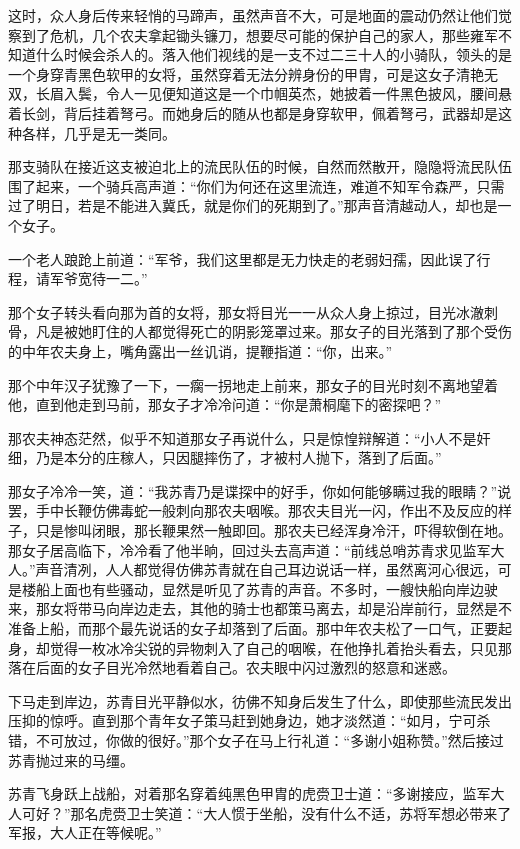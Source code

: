 这时，众人身后传来轻悄的马蹄声，虽然声音不大，可是地面的震动仍然让他们觉察到了危机，几个农夫拿起锄头镰刀，想要尽可能的保护自己的家人，那些雍军不知道什么时候会杀人的。落入他们视线的是一支不过二三十人的小骑队，领头的是一个身穿青黑色软甲的女将，虽然穿着无法分辨身份的甲胄，可是这女子清艳无双，长眉入鬓，令人一见便知道这是一个巾帼英杰，她披着一件黑色披风，腰间悬着长剑，背后挂着弩弓。而她身后的随从也都是身穿软甲，佩着弩弓，武器却是这种各样，几乎是无一类同。

那支骑队在接近这支被迫北上的流民队伍的时候，自然而然散开，隐隐将流民队伍围了起来，一个骑兵高声道：“你们为何还在这里流连，难道不知军令森严，只需过了明日，若是不能进入冀氏，就是你们的死期到了。”那声音清越动人，却也是一个女子。

一个老人踉跄上前道：“军爷，我们这里都是无力快走的老弱妇孺，因此误了行程，请军爷宽待一二。”

那个女子转头看向那为首的女将，那女将目光一一从众人身上掠过，目光冰澈刺骨，凡是被她盯住的人都觉得死亡的阴影笼罩过来。那女子的目光落到了那个受伤的中年农夫身上，嘴角露出一丝讥诮，提鞭指道：“你，出来。”

那个中年汉子犹豫了一下，一瘸一拐地走上前来，那女子的目光时刻不离地望着他，直到他走到马前，那女子才冷冷问道：“你是萧桐麾下的密探吧？”

那农夫神态茫然，似乎不知道那女子再说什么，只是惊惶辩解道：“小人不是奸细，乃是本分的庄稼人，只因腿摔伤了，才被村人抛下，落到了后面。”

那女子冷冷一笑，道：“我苏青乃是谍探中的好手，你如何能够瞒过我的眼睛？”说罢，手中长鞭仿佛毒蛇一般刺向那农夫咽喉。那农夫目光一闪，作出不及反应的样子，只是惨叫闭眼，那长鞭果然一触即回。那农夫已经浑身冷汗，吓得软倒在地。那女子居高临下，冷冷看了他半晌，回过头去高声道：“前线总哨苏青求见监军大人。”声音清冽，人人都觉得仿佛苏青就在自己耳边说话一样，虽然离河心很远，可是楼船上面也有些骚动，显然是听见了苏青的声音。不多时，一艘快船向岸边驶来，那女将带马向岸边走去，其他的骑士也都策马离去，却是沿岸前行，显然是不准备上船，而那个最先说话的女子却落到了后面。那中年农夫松了一口气，正要起身，却觉得一枚冰冷尖锐的异物刺入了自己的咽喉，在他挣扎着抬头看去，只见那落在后面的女子目光冷然地看着自己。农夫眼中闪过激烈的怒意和迷惑。

下马走到岸边，苏青目光平静似水，彷佛不知身后发生了什么，即使那些流民发出压抑的惊呼。直到那个青年女子策马赶到她身边，她才淡然道：“如月，宁可杀错，不可放过，你做的很好。”那个女子在马上行礼道：“多谢小姐称赞。”然后接过苏青抛过来的马缰。

苏青飞身跃上战船，对着那名穿着纯黑色甲胄的虎赍卫士道：“多谢接应，监军大人可好？”那名虎赍卫士笑道：“大人惯于坐船，没有什么不适，苏将军想必带来了军报，大人正在等候呢。”

